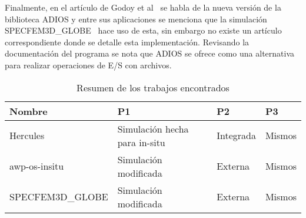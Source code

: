 Finalmente, en el artículo de Godoy et al~\cite{Godoy2020} se habla de la nueva versión de la biblioteca ADIOS y entre sus aplicaciones se menciona que la simulación SPECFEM3D\_GLOBE~\cite{Peter_Forward_and_adjoint_2011} hace uso de esta, sin embargo no existe un artículo correspondiente donde se detalle esta implementación. Revisando la documentación del programa se nota que ADIOS se ofrece como una alternativa para realizar operaciones de E/S con archivos.

\begin{table}[tbp]
    \begin{tabular}{|l|l|l|l|}
        \hline
        Nombre           & P1                            & P2        & P3     \\ \hline
        Hercules         & Simulación hecha para in-situ & Integrada & Mismos \\ \hline
        awp-os-insitu    & Simulación modificada         & Externa   & Mismos \\ \hline
        SPECFEM3D\_GLOBE & Simulación modificada         & Externa   & Mismos \\ \hline
    \end{tabular}
    \caption{Resumen de los trabajos encontrados}
    \label{table:related_work}
\end{table}